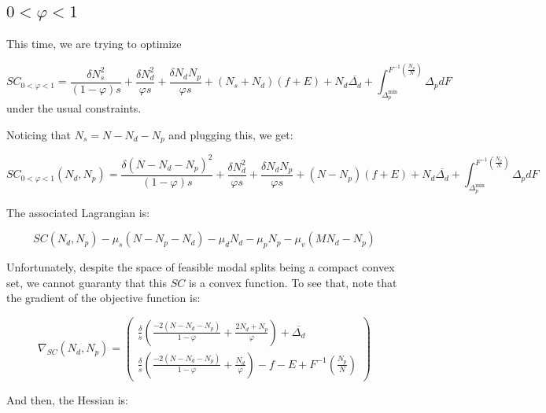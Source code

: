 \documentclass[english, a4paper]{article}
\theoremstyle{plain}
\theoremstyle{definition}
\theoremstyle{remark}
\begin{document}
\subsection{\texorpdfstring{$0 < \varphi < 1$}{0 < varphi < 1}}

This time, we are trying to optimize

\begin{equation}
\label{equation:SC_interior_3vars}
    SC_{0 <\varphi<1} = \frac{\delta N_s^2}{(1 - \varphi ) s} + \frac{\delta N_d^2}{\varphi s} + \frac{\delta N_d N_p}{\varphi s} + (N_s + N_d)(f + E) + N_d\overline{\Delta_d} + \int_{\Delta_p^{\text{min}}} ^{F^{-1}\left( \frac{N_p}{N} \right)} \Delta_pdF
\end{equation}
under the usual constraints.

Noticing that $N_s = N - N_d - N_p$ and plugging this, we get:

\begin{equation}
\label{equation:SC_interior_2vars}
    SC_{0 <\varphi<1} (N_d, N_p) = \frac{\delta (N - N_d - N_p)^2}{(1 - \varphi ) s} + \frac{\delta N_d^2}{\varphi s} + \frac{\delta N_d N_p}{\varphi s} + (N - N_p)(f + E) + N_d\overline{\Delta_d} + \int_{\Delta_p^{\text{min}}} ^{F^{-1}\left( \frac{N_p}{N} \right)} \Delta_pdF
\end{equation}

The associated Lagrangian is:

\begin{equation}
\label{equation:lagrangian}
    SC(N_d, N_p) -\mu_s(N - N_p - N_d) - \mu_d N_d - \mu_p N_p - \mu_v(MN_d - N_p)
\end{equation}

Unfortunately, despite the space of feasible modal splits being a compact convex set, we cannot guaranty that this $SC$ is a convex function. To see that, note that the gradient of the objective function is:

\begin{equation*}
    \nabla_{SC} (N_d, N_p) = \begin{pmatrix}
        \frac{\delta}{s} \left( \frac{-2(N - N_d - N_p)}{1 - \varphi} + \frac{2 N_d + N_p}{\varphi} \right) + \overline{\Delta_d}\\
        \frac{\delta}{s} \left( \frac{-2(N - N_d - N_p)}{1 - \varphi} + \frac{N_d}{\varphi} \right) -f - E + F^{-1} \left( \frac{N_p}{N} \right)
    \end{pmatrix}
\end{equation*}

And then, the Hessian is:
\end{document}
